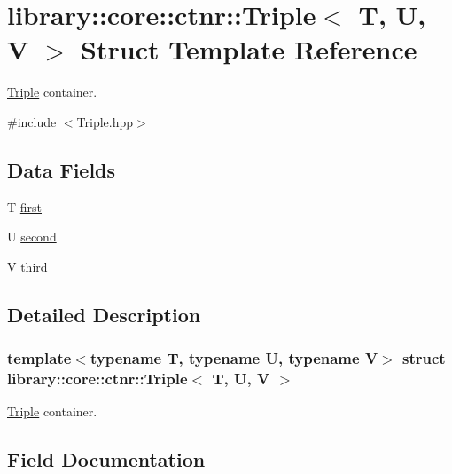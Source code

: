 \hypertarget{structlibrary_1_1core_1_1ctnr_1_1Triple}{}\section{library\+:\+:core\+:\+:ctnr\+:\+:Triple$<$ T, U, V $>$ Struct Template Reference}
\label{structlibrary_1_1core_1_1ctnr_1_1Triple}


\hyperlink{structlibrary_1_1core_1_1ctnr_1_1Triple}{Triple} container.  




{\ttfamily \#include $<$Triple.\+hpp$>$}

\subsection*{Data Fields}
\begin{DoxyCompactItemize}
\item 
T \hyperlink{structlibrary_1_1core_1_1ctnr_1_1Triple_a620996265dbacc4b8961fcdd4694d1f4}{first}
\item 
U \hyperlink{structlibrary_1_1core_1_1ctnr_1_1Triple_a6727b9eb6453f0db0d0abfcd64dbc87e}{second}
\item 
V \hyperlink{structlibrary_1_1core_1_1ctnr_1_1Triple_a5fdac90c0f2e7a33f2fc5f3fc4dba8e2}{third}
\end{DoxyCompactItemize}


\subsection{Detailed Description}
\subsubsection*{template$<$typename T, typename U, typename V$>$\newline
struct library\+::core\+::ctnr\+::\+Triple$<$ T, U, V $>$}

\hyperlink{structlibrary_1_1core_1_1ctnr_1_1Triple}{Triple} container. 

\subsection{Field Documentation}
\mbox{\label{structlibrary_1_1core_1_1ctnr_1_1Triple_a620996265dbacc4b8961fcdd4694d1f4}} 
